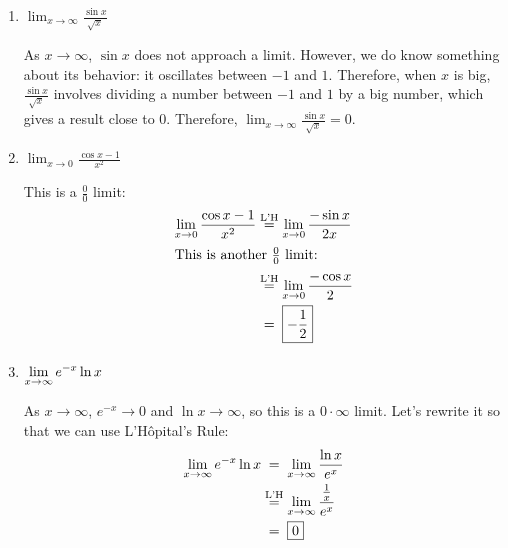 \documentclass{article}
\begin{document}
\begin{enumerate}
\begin{enumerate}
    \item
      \begin{problem}[\vfill]
        $\displaystyle \lim_{x \to \infty} \frac{\sin x}{\sqrt{x}}$
      \end{problem}

      \begin{solution} 
        As $x \to \infty$, $\sin x$ does not approach a limit.  However,
        we do know something about its behavior: it oscillates between
        $-1$ and $1$.  Therefore, when $x$ is big, $\frac{\sin
          x}{\sqrt{x}}$ involves dividing a number between $-1$ and $1$ by
        a big number, which gives a result close to 0.  Therefore,
        $\displaystyle \lim_{x \to \infty} \frac{\sin x}{\sqrt{x}} =
        \boxed{0}$.
      \end{solution}

    \item
      \begin{problem}[\vfill]
        $\displaystyle \lim_{x \to 0 } \frac{\cos x -1}{x^2}$
      \end{problem}

      \begin{solution}
        This is a $\frac{0}{0}$ limit:
        \begin{align*}
          \lim_{x \to 0 } \frac{\cos x -1}{x^2} & \lheq \lim_{x \to 0}
          \frac{-\sin x}{2x} \\
          \shortintertext{This is another $\frac{0}{0}$ limit:}
          & \lheq \lim_{x \to 0} \frac{- \cos x}{2} \\
          & \nolheq \boxed{ - \frac{1}{2}}
        \end{align*}
      \end{solution}

      \pspace{\newpage}

    \item
      \begin{problem}[\vfill]
        $\displaystyle \lim_{x\to\infty} e^{-x}\ln x\vphantom{\frac{1}{1}}$
      \end{problem}

      \begin{solution}
        As $x \to \infty$, $e^{-x} \to 0$ and $\ln x \to \infty$, so this
        is a $0 \cdot \infty$ limit.  Let's rewrite it so that we can use
        L'H\^opital's Rule:
        \begin{align*}
          \lim_{x \to \infty} e^{-x} \ln x & \nolheq \lim_{x \to \infty}
          \frac{\ln x}{e^x} \\
          & \lheq \lim_{x \to \infty} \frac{\frac{1}{x}}{e^x} \\
          & \nolheq \boxed{0}
        \end{align*}
      \end{solution}


\end{enumerate}
\end{enumerate}
\end{document}
